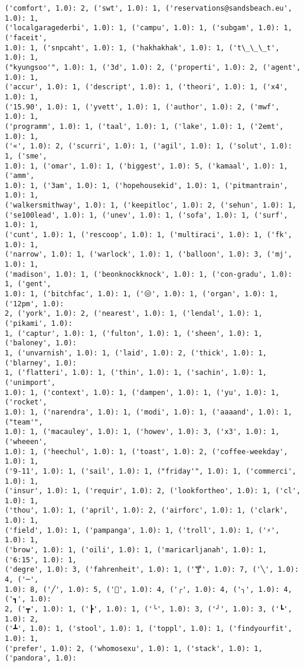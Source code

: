 \documentclass[11pt]{article}
\begin{document}
\begin{Verbatim}[commandchars=\\\{\}]
('comfort', 1.0): 2, ('swt', 1.0): 1, ('reservations@sandsbeach.eu', 1.0): 1,
('localgaragederbi', 1.0): 1, ('campu', 1.0): 1, ('subgam', 1.0): 1, ('faceit',
1.0): 1, ('snpcaht', 1.0): 1, ('hakhakhak', 1.0): 1, ('t\_\_\_t', 1.0): 1,
("kyungsoo'", 1.0): 1, ('3d', 1.0): 2, ('properti', 1.0): 2, ('agent', 1.0): 1,
('accur', 1.0): 1, ('descript', 1.0): 1, ('theori', 1.0): 1, ('x4', 1.0): 1,
('15.90', 1.0): 1, ('yvett', 1.0): 1, ('author', 1.0): 2, ('mwf', 1.0): 1,
('programm', 1.0): 1, ('taal', 1.0): 1, ('lake', 1.0): 1, ('2emt', 1.0): 1,
('«', 1.0): 2, ('scurri', 1.0): 1, ('agil', 1.0): 1, ('solut', 1.0): 1, ('sme',
1.0): 1, ('omar', 1.0): 1, ('biggest', 1.0): 5, ('kamaal', 1.0): 1, ('amm',
1.0): 1, ('3am', 1.0): 1, ('hopehousekid', 1.0): 1, ('pitmantrain', 1.0): 1,
('walkersmithway', 1.0): 1, ('keepitloc', 1.0): 2, ('sehun', 1.0): 1,
('se100lead', 1.0): 1, ('unev', 1.0): 1, ('sofa', 1.0): 1, ('surf', 1.0): 1,
('cunt', 1.0): 1, ('rescoop', 1.0): 1, ('multiraci', 1.0): 1, ('fk', 1.0): 1,
('narrow', 1.0): 1, ('warlock', 1.0): 1, ('balloon', 1.0): 3, ('mj', 1.0): 1,
('madison', 1.0): 1, ('beonknockknock', 1.0): 1, ('con-gradu', 1.0): 1, ('gent',
1.0): 1, ('bitchfac', 1.0): 1, ('😒', 1.0): 1, ('organ', 1.0): 1, ('12pm', 1.0):
2, ('york', 1.0): 2, ('nearest', 1.0): 1, ('lendal', 1.0): 1, ('pikami', 1.0):
1, ('captur', 1.0): 1, ('fulton', 1.0): 1, ('sheen', 1.0): 1, ('baloney', 1.0):
1, ('unvarnish', 1.0): 1, ('laid', 1.0): 2, ('thick', 1.0): 1, ('blarney', 1.0):
1, ('flatteri', 1.0): 1, ('thin', 1.0): 1, ('sachin', 1.0): 1, ('unimport',
1.0): 1, ('context', 1.0): 1, ('dampen', 1.0): 1, ('yu', 1.0): 1, ('rocket',
1.0): 1, ('narendra', 1.0): 1, ('modi', 1.0): 1, ('aaaand', 1.0): 1, ("team'",
1.0): 1, ('macauley', 1.0): 1, ('howev', 1.0): 3, ('x3', 1.0): 1, ('wheeen',
1.0): 1, ('heechul', 1.0): 1, ('toast', 1.0): 2, ('coffee-weekday', 1.0): 1,
('9-11', 1.0): 1, ('sail', 1.0): 1, ("friday'", 1.0): 1, ('commerci', 1.0): 1,
('insur', 1.0): 1, ('requir', 1.0): 2, ('lookfortheo', 1.0): 1, ('cl', 1.0): 1,
('thou', 1.0): 1, ('april', 1.0): 2, ('airforc', 1.0): 1, ('clark', 1.0): 1,
('field', 1.0): 1, ('pampanga', 1.0): 1, ('troll', 1.0): 1, ('⚡', 1.0): 1,
('brow', 1.0): 1, ('oili', 1.0): 1, ('maricarljanah', 1.0): 1, ('6:15', 1.0): 1,
('degre', 1.0): 3, ('fahrenheit', 1.0): 1, ('🍸', 1.0): 7, ('╲', 1.0): 4, ('─',
1.0): 8, ('╱', 1.0): 5, ('🍤', 1.0): 4, ('╭', 1.0): 4, ('╮', 1.0): 4, ('┓', 1.0):
2, ('┳', 1.0): 1, ('┣', 1.0): 1, ('╰', 1.0): 3, ('╯', 1.0): 3, ('┗', 1.0): 2,
('┻', 1.0): 1, ('stool', 1.0): 1, ('toppl', 1.0): 1, ('findyourfit', 1.0): 1,
('prefer', 1.0): 2, ('whomosexu', 1.0): 1, ('stack', 1.0): 1, ('pandora', 1.0):

\end{Verbatim}
\end{document}
